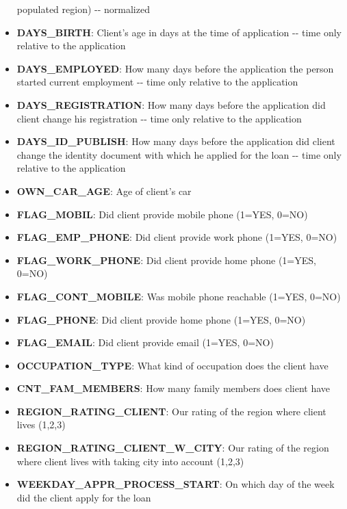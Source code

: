 \documentclass[11pt]{article}
\begin{document}
\begin{itemize}
  populated region) -\/- normalized
\item
  \textbf{DAYS\_BIRTH}: Client's age in days at the time of application
  -\/- time only relative to the application
\item
  \textbf{DAYS\_EMPLOYED}: How many days before the application the
  person started current employment -\/- time only relative to the
  application
\item
  \textbf{DAYS\_REGISTRATION}: How many days before the application did
  client change his registration -\/- time only relative to the
  application
\item
  \textbf{DAYS\_ID\_PUBLISH}: How many days before the application did
  client change the identity document with which he applied for the loan
  -\/- time only relative to the application
\item
  \textbf{OWN\_CAR\_AGE}: Age of client's car\\
\item
  \textbf{FLAG\_MOBIL}: Did client provide mobile phone (1=YES, 0=NO)
\item
  \textbf{FLAG\_EMP\_PHONE}: Did client provide work phone (1=YES,
  0=NO)\\
\item
  \textbf{FLAG\_WORK\_PHONE}: Did client provide home phone (1=YES,
  0=NO)\\
\item
  \textbf{FLAG\_CONT\_MOBILE}: Was mobile phone reachable (1=YES,
  0=NO)\\
\item
  \textbf{FLAG\_PHONE}: Did client provide home phone (1=YES, 0=NO)\\
\item
  \textbf{FLAG\_EMAIL}: Did client provide email (1=YES, 0=NO)\\
\item
  \textbf{OCCUPATION\_TYPE}: What kind of occupation does the client
  have
\item
  \textbf{CNT\_FAM\_MEMBERS}: How many family members does client have
\item
  \textbf{REGION\_RATING\_CLIENT}: Our rating of the region where client
  lives (1,2,3)
\item
  \textbf{REGION\_RATING\_CLIENT\_W\_CITY}: Our rating of the region
  where client lives with taking city into account (1,2,3)\\
\item
  \textbf{WEEKDAY\_APPR\_PROCESS\_START}: On which day of the week did
  the client apply for the loan\\

\end{itemize}
\end{document}
